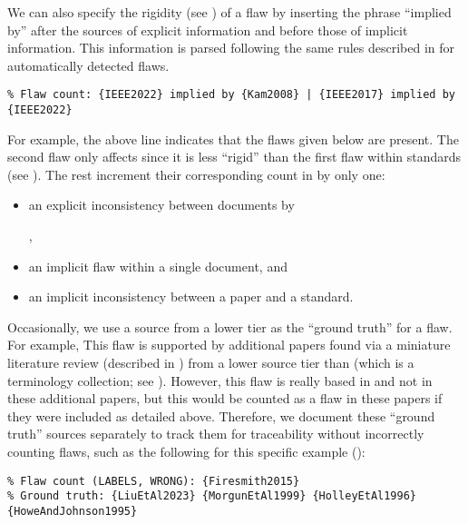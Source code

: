We can also specify the rigidity (see ) of a flaw by inserting
the phrase ``implied by'' after the sources of explicit information and before
those of implicit information. This information is parsed following the same
rules described in  for automatically
detected flaws.
\begin{displayquote}
    \texttt{\% Flaw count: \{IEEE2022\} implied by \{Kam2008\} |
        \displayNL \{IEEE2017\} implied by \{IEEE2022\}}
\end{displayquote}
For example, the above line indicates that the flaws given below are
present. The second flaw only affects  since it
is less ``rigid'' than the first flaw within standards (see ).
The rest increment their corresponding count in
 by only one:
\begin{itemize}
    \item an explicit inconsistency between documents by
          \begin{NoHyper}\citeauthor{IEEE2022}\end{NoHyper},
    \item an implicit flaw within a single document, and
    \item an implicit inconsistency between a paper and a standard.
\end{itemize}

Occasionally, we use a source from a lower tier as the ``ground truth'' for a
flaw. For example, \tolTestFlaw*{} This flaw is supported
by additional papers found via a miniature literature review (described in
) from a lower source tier than \citep{Firesmith2015}
(which is a terminology collection; see ). However, this flaw
is really based in \citep{Firesmith2015} and not in these
additional papers, but this would be counted as a flaw in these papers if they
were included as detailed above. Therefore, we document these ``ground
truth'' sources separately to track them for traceability without incorrectly
counting flaws, such as the following for this specific example
():
\begin{displayquote}
    \texttt{\% Flaw count (LABELS, WRONG): \{Firesmith2015\}\\
        \% Ground truth: \{LiuEtAl2023\} \{MorgunEtAl1999\} \{HolleyEtAl1996\}
        \displayNL \{HoweAndJohnson1995\}}
\end{displayquote}

